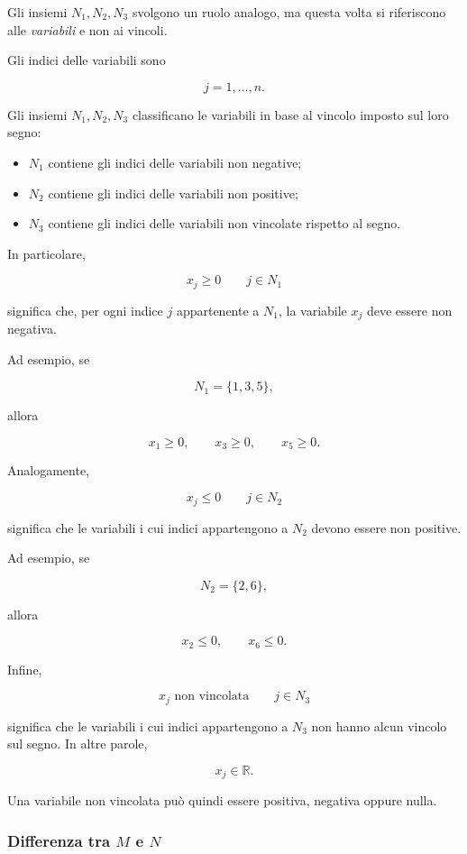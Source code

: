 Gli insiemi $N_1,N_2,N_3$ svolgono un ruolo analogo, ma questa volta
si riferiscono alle \emph{variabili} e non ai vincoli.

Gli indici delle variabili sono

\[
j=1,\ldots,n.
\]

Gli insiemi $N_1,N_2,N_3$ classificano le variabili in base al
vincolo imposto sul loro segno:

\begin{itemize}
    \item $N_1$ contiene gli indici delle variabili non negative;
    \item $N_2$ contiene gli indici delle variabili non positive;
    \item $N_3$ contiene gli indici delle variabili non vincolate
    rispetto al segno.
\end{itemize}

In particolare,

\[
x_j\ge0
\qquad j\in N_1
\]

significa che, per ogni indice $j$ appartenente a $N_1$, la variabile
$x_j$ deve essere non negativa.

Ad esempio, se

\[
N_1=\{1,3,5\},
\]

allora

\[
x_1\ge0,\qquad x_3\ge0,\qquad x_5\ge0.
\]

Analogamente,

\[
x_j\le0
\qquad j\in N_2
\]

significa che le variabili i cui indici appartengono a $N_2$ devono
essere non positive.

Ad esempio, se

\[
N_2=\{2,6\},
\]

allora

\[
x_2\le0,\qquad x_6\le0.
\]

Infine,

\[
x_j\text{ non vincolata}
\qquad j\in N_3
\]

significa che le variabili i cui indici appartengono a $N_3$ non hanno
alcun vincolo sul segno. In altre parole,

\[
x_j\in\mathbb{R}.
\]

Una variabile non vincolata può quindi essere positiva, negativa
oppure nulla.

\subsubsection*{Differenza tra $M$ e $N$}


